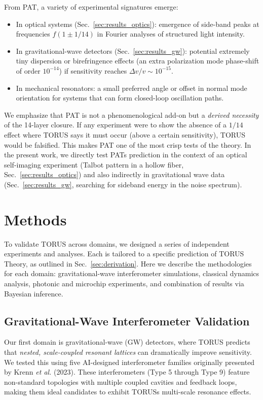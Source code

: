 \documentclass{article}
\begin{document}
From PAT, a variety of experimental signatures emerge:
\begin{itemize}\itemsep 0pt
    \item In optical systems (Sec.~\ref{sec:results_optics}): emergence of side-band peaks at frequencies $f(1\pm 1/14)$ in Fourier analyses of structured light intensity.
    \item In gravitational-wave detectors (Sec.~\ref{sec:results_gw}): potential extremely tiny dispersion or birefringence effects (an extra polarization mode phase-shift of order $10^{-14}$) if sensitivity reaches $\Delta v/v \sim 10^{-15}$.
    \item In mechanical resonators: a small preferred angle or offset in normal mode orientation for systems that can form closed-loop oscillation paths.
\end{itemize}

We emphasize that PAT is not a phenomenological add-on but a \emph{derived necessity} of the 14-layer closure. If any experiment were to show the absence of a $1/14$ effect where TORUS says it must occur (above a certain sensitivity), TORUS would be falsified. This makes PAT one of the most crisp tests of the theory. In the present work, we directly test PATs prediction in the context of an optical self-imaging experiment (Talbot pattern in a hollow fiber, Sec.~\ref{sec:results_optics}) and also indirectly in gravitational wave data (Sec.~\ref{sec:results_gw}, searching for sideband energy in the noise spectrum).

\section{Methods}\label{sec:methods}
To validate TORUS across domains, we designed a series of independent experiments and analyses. Each is tailored to a specific prediction of TORUS Theory, as outlined in Sec.~\ref{sec:derivation}. Here we describe the methodologies for each domain: gravitational-wave interferometer simulations, classical dynamics analysis, photonic and microchip experiments, and combination of results via Bayesian inference.

\subsection{Gravitational-Wave Interferometer Validation}\label{sec:methods_gw}
Our first domain is gravitational-wave (GW) detectors, where TORUS predicts that \emph{nested, scale-coupled resonant lattices} can dramatically improve sensitivity. We tested this using five AI-designed interferometer families originally presented by Krenn \emph{et al.} (2023). These interferometers (Type 5 through Type 9) feature non-standard topologies with multiple coupled cavities and feedback loops, making them ideal candidates to exhibit TORUSs multi-scale resonance effects.
\end{document}
